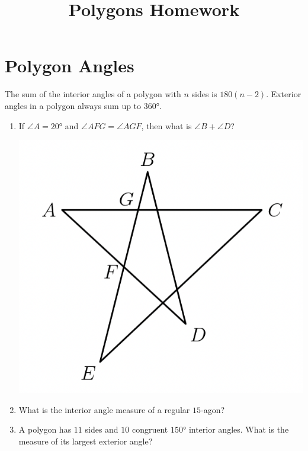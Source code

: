 \documentclass{article}
\title{Polygons Homework}
\author{}
\date{}
\begin{document}
\maketitle
\section*{Polygon Angles}
The sum of the interior angles of a polygon with $n$ sides is $180(n - 2)$. 
Exterior angles in a polygon always sum up to $\ang{360}$.
\begin{enumerate}
    \item If $\angle A = \ang{20}$ and $\angle AFG = \angle AGF$, then what is $\angle B + \angle D$?
        \begin{center}
            \includegraphics[scale=0.5]{star.png}
        \end{center}
        \vspace{1 cm}
    \item What is the interior angle measure of a regular $15$-agon?
        \vspace{3cm}
    \item A polygon has $11$ sides and $10$ congruent $\ang{150}$ interior angles.
        What is the measure of its largest exterior angle?
        \vspace{3 cm}
\end{enumerate}
\end{document}
